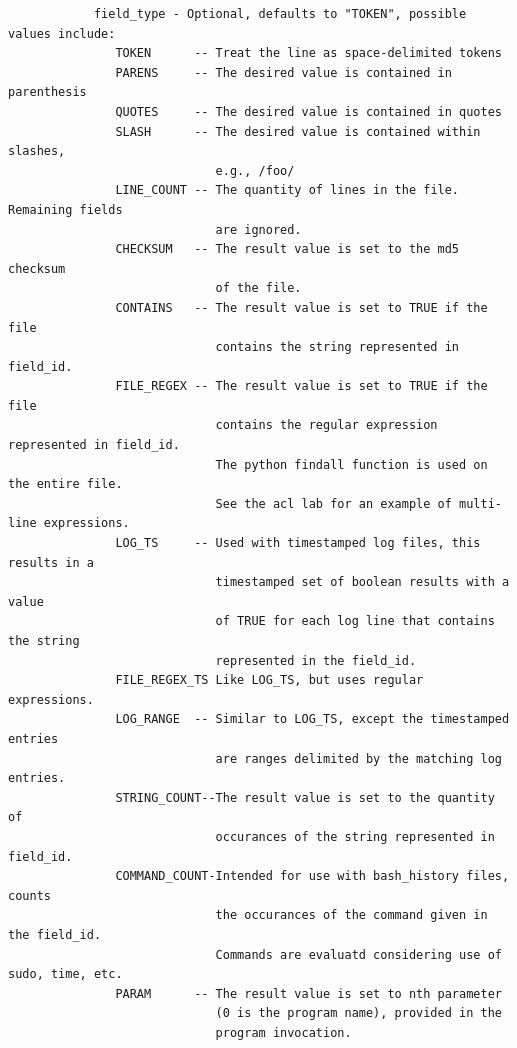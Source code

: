 \documentclass[12pt]{article}
\begin{document}
\begin{verbatim}
            field_type - Optional, defaults to "TOKEN", possible values include:
               TOKEN      -- Treat the line as space-delimited tokens
               PARENS     -- The desired value is contained in parenthesis
               QUOTES     -- The desired value is contained in quotes
               SLASH      -- The desired value is contained within slashes, 
                             e.g., /foo/
               LINE_COUNT -- The quantity of lines in the file. Remaining fields 
                             are ignored.
               CHECKSUM   -- The result value is set to the md5 checksum 
                             of the file.
               CONTAINS   -- The result value is set to TRUE if the file 
                             contains the string represented in field_id.
               FILE_REGEX -- The result value is set to TRUE if the file 
                             contains the regular expression represented in field_id.
                             The python findall function is used on the entire file.
                             See the acl lab for an example of multi-line expressions.
               LOG_TS     -- Used with timestamped log files, this results in a 
                             timestamped set of boolean results with a value
                             of TRUE for each log line that contains the string 
                             represented in the field_id.
               FILE_REGEX_TS Like LOG_TS, but uses regular expressions.
               LOG_RANGE  -- Similar to LOG_TS, except the timestamped entries
                             are ranges delimited by the matching log entries.
               STRING_COUNT--The result value is set to the quantity of
                             occurances of the string represented in field_id.
               COMMAND_COUNT-Intended for use with bash_history files, counts
                             the occurances of the command given in the field_id.
                             Commands are evaluatd considering use of sudo, time, etc.
               PARAM      -- The result value is set to nth parameter
                             (0 is the program name), provided in the 
                             program invocation.  
                             

\end{verbatim}
\end{document}
